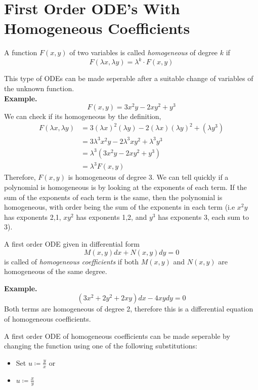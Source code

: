 \documentclass[openany]{report}
\begin{document}
\section{First Order ODE's With Homogeneous Coefficients}
\begin{definition}
    A function $F(x,y)$ of two variables is called \emph{homogeneous} of degree $k$ if 
    \[F(\lambda x, \lambda y) = \lambda^k \cdot F(x,y)\]
\end{definition}
This type of ODEs can be made seperable after a suitable change of variables of the unknown function.\\[2ex]
\noindent
\textbf{Example.}
\[F(x,y) = 3x^2y - 2xy^2 + y^3\]
We can check if its homogeneous by the definition, 
\begin{align*}
    F(\lambda x, \lambda y) &= 3(\lambda x)^2 (\lambda y) - 2(\lambda x) (\lambda y)^2 + (\lambda y^3)\\
    &= 3\lambda^3x^2y - 2\lambda^3xy^2 + \lambda^3y^3\\
    &= \lambda^3(3x^2y - 2xy^2 + y^3)\\
    &= \lambda^3F(x,y)
\end{align*}
Therefore, $F(x,y)$ is homogeneous of degree 3. We can tell quickly if a polynomial is homogeneous is by looking at the exponents of each term. If the sum of the exponents of each term is the same, then the polynomial is homogeneous, with order being the sum of the exponents in each term (i.e $x^2y$ has exponents 2,1, $xy^2$ has exponents 1,2, and $y^3$ has exponents 3, each sum to 3).\\[2ex]
\begin{definition}
    A first order ODE given in differential form
    \[M(x,y)dx + N(x,y)dy = 0\]
    is called of \emph{homogeneous coefficients} if both $M(x,y)$ and $N(x,y)$ are homogeneous of the same degree.
\end{definition}
\noindent
\textbf{Example.}
\[(3x^2+2y^2+2xy)dx - 4xydy = 0\]
Both terms are homogeneous of degree 2, therefore this is a differential equation of homogeneous coefficients. 
\begin{theorem}
    A first order ODE of homogeneous coefficients can be made seperable by changing the function using one of the following substitutions:
    \begin{itemize}
        \item Set $u \coloneqq \frac{y}{x}$ or
        \item $u \coloneqq \frac{x}{y}$
    \end{itemize}
\end{theorem}
\end{document}
